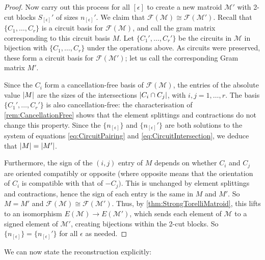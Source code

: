 \documentclass[12pt]{report}
\theoremstyle{definition}
\DeclarePairedDelimiter\abs{\lvert}{\rvert}
\def\calF{\mathcal F}
\def\calM{\mathcal M}
\theoremstyle{upright}
\begin{document}
\begin{proof}
    Now carry out this process for all $[\epsilon]$ to create a new matroid $\calM'$ with 2-cut blocks $S_{[\epsilon]}'$ of sizes $n_{[\epsilon]}'$.
    We claim that $\calF(\calM)\cong\calF(\calM')$.
    Recall that $\{C_1, \dots, C_r\}$ is a circuit basis for $\calF(\calM)$, and call the gram matrix corresponding to this circuit basis $M$.
    Let $\{C_1', \dots, C_r'\}$ be the circuits in $\calM$ in bijection with $\{C_1, \dots, C_r\}$ under the operations above.
    As circuits were preserved, these form a circuit basis for $\calF(\calM')$; let us call the corresponding Gram matrix $M'$.

    Since the $C_i$ form a cancellation-free basis of $\calF(\calM)$, the entries of the absolute value $\abs*{M}$ are the sizes of the intersections $\abs*{C_i\cap C_j}$, with $i, j=1, \dots, r$.
    The basis $\{C_1', \dots, C_r'\}$ is also cancellation-free: the characterisation of \cref{rem:CancellationFree} shows that the element splittings and contractions do not change this property.
    Since the $\{n_{[\epsilon]}\}$ and $\{n_{[\epsilon]}'\}$ are both solutions to the system of equations \eqref{eq:CircuitPairing} and \eqref{eq:CircuitIntersection}, we deduce that $\abs*{M}=\abs*{M'}$.

    Furthermore, the sign of the $(i, j)$ entry of $M$ depends on whether $C_i$ and $C_j$ are oriented compatibly or opposite (where opposite means that the orientation of $C_i$ is compatible with that of $-C_j)$.
    This is unchanged by element splittings and contractions, hence the sign of each entry is the same in $M$ and $M'$.
    So $M=M'$ and $\calF(\calM)\cong\calF(\calM')$.
    Thus, by \cref{thm:StrongTorelliMatroid}, this lifts to an isomorphism $E(\calM)\rightarrow E(\calM')$, which sends each element of $\calM$ to a signed element of $\calM'$, creating bijections within the 2-cut blocks.
    So $\{n_{[\epsilon]}\}=\{n_{[\epsilon]}'\}$ for all $\epsilon$ as needed.
    
\end{proof}

We can now state the reconstruction explicitly:
\end{document}
